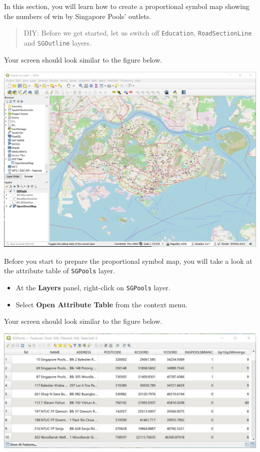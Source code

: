 \documentclass[
  letterpaper,
  DIV=11,
  numbers=noendperiod]{scrreprt}
\providecommand{\tightlist}{%
  \setlength{\itemsep}{0pt}\setlength{\parskip}{0pt}}\usepackage{longtable,booktabs,array}
\begin{document}
In this section, you will learn how to create a proportional symbol map
showing the numbers of win by Singapore Pools' outlets.

\begin{quote}
DIY: Before we get started, let us switch off \texttt{Education},
\texttt{RoadSectionLine} and \texttt{SGOutline} layers.
\end{quote}

Your screen should look similar to the figure below.

\includegraphics{./img03/image11.jpg}

Before you start to prepare the proportional symbol map, you will take a
look at the attribute table of \texttt{SGPools} layer.

\begin{itemize}
\tightlist
\item
  At the \textbf{Layers} panel, right-click on \texttt{SGPools} layer.
\item
  Select \textbf{Open Attribute Table} from the context menu.
\end{itemize}

Your screen should look similar to the figure below.

\includegraphics{./img03/image12.jpg}
\end{document}
